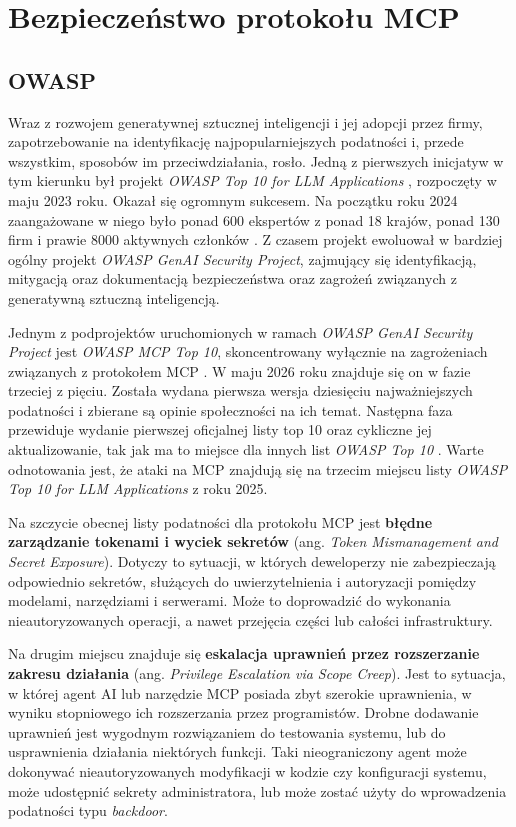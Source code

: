 \newpage
\section{Bezpieczeństwo protokołu MCP}

\subsection{OWASP}

Wraz z rozwojem generatywnej sztucznej inteligencji i jej adopcji przez firmy, zapotrzebowanie na identyfikację najpopularniejszych podatności i, przede wszystkim, sposobów im przeciwdziałania, rosło. Jedną z pierwszych inicjatyw w tym kierunku był projekt \textit{OWASP Top 10 for LLM Applications} \cite{owasp-top-10-llm}, rozpoczęty w maju 2023 roku. Okazał się ogromnym sukcesem. Na początku roku 2024 zaangażowane w niego było ponad 600 ekspertów z ponad 18 krajów, ponad 130 firm i prawie 8000 aktywnych członków \cite{genai-owasp}. Z czasem projekt ewoluował w bardziej ogólny projekt \textit{OWASP GenAI Security Project}, zajmujący się identyfikacją, mitygacją oraz dokumentacją bezpieczeństwa oraz zagrożeń związanych z generatywną sztuczną inteligencją.

Jednym z podprojektów uruchomionych w ramach \textit{OWASP GenAI Security Project} jest \textit{OWASP MCP Top 10}, skoncentrowany wyłącznie na zagrożeniach związanych z protokołem MCP \cite{owasp-top-10-mcp-github}. W maju 2026 roku znajduje się on w fazie trzeciej z pięciu. Została wydana pierwsza wersja dziesięciu najważniejszych podatności i zbierane są opinie społeczności na ich temat. Następna faza przewiduje wydanie pierwszej oficjalnej listy top 10 oraz cykliczne jej aktualizowanie, tak jak ma to miejsce dla innych list \textit{OWASP Top 10} \cite{owasp-top-10-mcp}. Warte odnotowania jest, że ataki na MCP znajdują się na trzecim miejscu listy \textit{OWASP Top 10 for LLM Applications} z roku 2025.

Na szczycie obecnej listy podatności dla protokołu MCP jest \textbf{błędne zarządzanie tokenami i wyciek sekretów} (ang. \textit{Token Mismanagement and Secret Exposure}). Dotyczy to sytuacji, w których deweloperzy nie zabezpieczają odpowiednio sekretów, służących do uwierzytelnienia i autoryzacji pomiędzy modelami, narzędziami i serwerami. Może to doprowadzić do wykonania nieautoryzowanych operacji, a nawet przejęcia części lub całości infrastruktury.

Na drugim miejscu znajduje się \textbf{eskalacja uprawnień przez rozszerzanie zakresu działania} (ang. \textit{Privilege Escalation via Scope Creep}). Jest to sytuacja, w której agent AI lub narzędzie MCP posiada zbyt szerokie uprawnienia, w wyniku stopniowego ich rozszerzania przez programistów. Drobne dodawanie uprawnień jest wygodnym rozwiązaniem do testowania systemu, lub do usprawnienia działania niektórych funkcji. Taki nieograniczony agent może dokonywać nieautoryzowanych modyfikacji w kodzie czy konfiguracji systemu, może udostępnić sekrety administratora, lub może zostać użyty do wprowadzenia podatności typu \textit{backdoor}.


